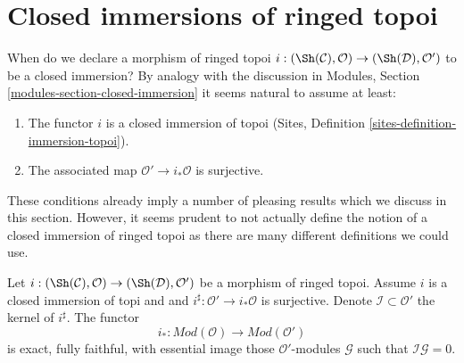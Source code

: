 \section{Closed immersions of ringed topoi}
\label{section-closed-immersion}

\noindent
When do we declare a morphism of ringed topoi
$i : (\Sh(\mathcal{C}), \mathcal{O}) \to (\Sh(\mathcal{D}), \mathcal{O}')$
to be a closed immersion? By analogy with the discussion in
Modules, Section \ref{modules-section-closed-immersion}
it seems natural to assume at least:
\begin{enumerate}
\item The functor $i$ is a closed immersion of topoi
(Sites, Definition \ref{sites-definition-immersion-topoi}).
\item The associated map $\mathcal{O}' \to i_*\mathcal{O}$ is surjective.
\end{enumerate}
These conditions already imply a number of pleasing results which we discuss
in this section. However, it seems prudent to not actually define the
notion of a closed immersion of ringed topoi as there are many different
definitions we could use.

\begin{lemma}
\label{lemma-i-star-equivalence}
Let $i : (\Sh(\mathcal{C}), \mathcal{O}) \to (\Sh(\mathcal{D}), \mathcal{O}')$
be a morphism of ringed topoi. Assume $i$ is a closed immersion of topi
and and $i^\sharp : \mathcal{O}' \to i_*\mathcal{O}$ is surjective.
Denote $\mathcal{I} \subset \mathcal{O}'$ the kernel of $i^\sharp$.
The functor
$$
i_* :
\textit{Mod}(\mathcal{O})
\longrightarrow
\textit{Mod}(\mathcal{O}')
$$
is exact, fully faithful, with essential image those
$\mathcal{O}'$-modules $\mathcal{G}$ such that $\mathcal{I}\mathcal{G} = 0$.
\end{lemma}

